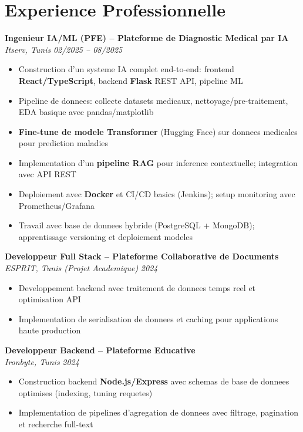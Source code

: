 \documentclass[10pt,a4paper]{article}
\begin{document}
\section*{Experience Professionnelle}
{\small

\textbf{Ingenieur IA/ML (PFE) -- Plateforme de Diagnostic Medical par IA}\\[1pt]
\textit{Itserv, Tunis} \hfill \textit{02/2025 -- 08/2025}
\begin{itemize}
  \item Construction d'un systeme IA complet end-to-end: frontend \textbf{React/TypeScript}, backend \textbf{Flask} REST API, pipeline ML
  \item Pipeline de donnees: collecte datasets medicaux, nettoyage/pre-traitement, EDA basique avec pandas/matplotlib
  \item \textbf{Fine-tune de modele Transformer} (Hugging Face) sur donnees medicales pour prediction maladies
  \item Implementation d'un \textbf{pipeline RAG} pour inference contextuelle; integration avec API REST
  \item Deploiement avec \textbf{Docker} et CI/CD basics (Jenkins); setup monitoring avec Prometheus/Grafana
  \item Travail avec base de donnees hybride (PostgreSQL + MongoDB); apprentissage versioning et deploiement modeles
\end{itemize}

\vspace{3pt}
\textbf{Developpeur Full Stack -- Plateforme Collaborative de Documents}\\[1pt]
\textit{ESPRIT, Tunis (Projet Academique)} \hfill \textit{2024}
\begin{itemize}
  \item Developpement backend avec traitement de donnees temps reel et optimisation API
  \item Implementation de serialisation de donnees et caching pour applications haute production
\end{itemize}

\vspace{3pt}
\textbf{Developpeur Backend -- Plateforme Educative}\\[1pt]
\textit{Ironbyte, Tunis} \hfill \textit{2024}
\begin{itemize}
  \item Construction backend \textbf{Node.js/Express} avec schemas de base de donnees optimises (indexing, tuning requetes)
  \item Implementation de pipelines d'agregation de donnees avec filtrage, pagination et recherche full-text
\end{itemize}

}
\end{document}

